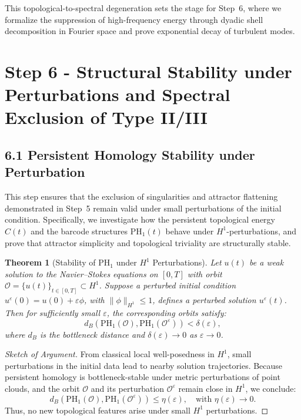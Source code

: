 \documentclass[11pt]{article}
\newtheorem{theorem}{Theorem}[section]
\theoremstyle{definition}
\begin{document}
This topological-to-spectral degeneration sets the stage for Step~6, where we formalize the suppression of high-frequency energy through dyadic shell decomposition in Fourier space and prove exponential decay of turbulent modes.



\section{Step 6 - Structural Stability under Perturbations and Spectral Exclusion of Type II/III}
\label{sec:step6}

\subsection{6.1 Persistent Homology Stability under Perturbation}

This step ensures that the exclusion of singularities and attractor flattening demonstrated in Step~5 remain valid under small perturbations of the initial condition. Specifically, we investigate how the persistent topological energy $C(t)$ and the barcode structures $\mathrm{PH}_1(t)$ behave under $H^1$-perturbations, and prove that attractor simplicity and topological triviality are structurally stable.

\begin{theorem}[Stability of PH$_1$ under $H^1$ Perturbations]
Let $u(t)$ be a weak solution to the Navier--Stokes equations on $[0,T]$ with orbit $\mathcal{O} = \{ u(t) \}_{t \in [0,T]} \subset H^1$. Suppose a perturbed initial condition $u^\varepsilon(0) = u(0) + \varepsilon \phi$, with $\|\phi\|_{H^1} \le 1$, defines a perturbed solution $u^\varepsilon(t)$. Then for sufficiently small $\varepsilon$, the corresponding orbits satisfy:
\[
d_B(\mathrm{PH}_1(\mathcal{O}), \mathrm{PH}_1(\mathcal{O}^\varepsilon)) < \delta(\varepsilon),
\]
where $d_B$ is the bottleneck distance and $\delta(\varepsilon) \to 0$ as $\varepsilon \to 0$.
\end{theorem}

\begin{proof}[Sketch of Argument]
From classical local well-posedness in $H^1$, small perturbations in the initial data lead to nearby solution trajectories. Because persistent homology is bottleneck-stable under metric perturbations of point clouds, and the orbit $\mathcal{O}$ and its perturbation $\mathcal{O}^\varepsilon$ remain close in $H^1$, we conclude:
\[
d_B(\mathrm{PH}_1(\mathcal{O}), \mathrm{PH}_1(\mathcal{O}^\varepsilon)) \le \eta(\varepsilon), \quad \text{with } \eta(\varepsilon) \to 0.
\]
Thus, no new topological features arise under small $H^1$ perturbations.
\end{proof}
\end{document}
